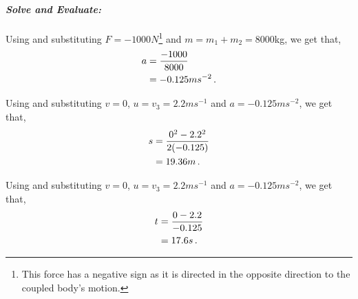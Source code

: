 \begin{subquestions}
\begin{subsubquestions}
\textbf{\textit{Solve and Evaluate:}} \\ \\
Using  and substituting $F=-1000N$\footnote{This force has a negative sign as it is directed in the opposite direction to the coupled body's motion.} and $m=m_1+m_2=8000$kg, we get that,
\begin{align}
	a & = \frac{-1000}{8000} \nonumber \\
	  & = -0.125ms^{-2} \,. 
\end{align}

Using  and substituting $v=0$, $u=v_3=2.2ms^{-1}$ and $a=-0.125ms^{-2}$, we get that,
\begin{align}
	s & = \frac{0^2-2.2^2}{2(-0.125)} \nonumber \\
	  & = 19.36m \,.
\end{align}

Using  and substituting $v=0$, $u=v_3=2.2ms^{-1}$ and $a=-0.125ms^{-2}$, we get that,
\begin{align}
	t & = \frac{0-2.2}{-0.125} \nonumber \\
	  & = 17.6s \,.
\end{align}

\end{subsubquestions}
	
\end{subquestions}